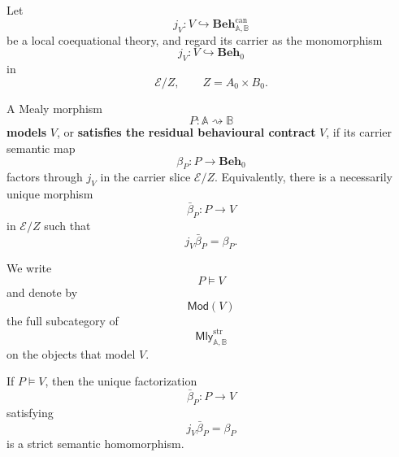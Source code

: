 \begin{definition}
\label{def:models-coequational-theory}
    Let
    \[
        j_V:
        V\hookrightarrow
        \mathbf{Beh}^{\mathrm{can}}_{\mathbb A,\mathbb B}
    \]
    be a local coequational theory, and regard its carrier as the monomorphism
    \[
        j_V:V\hookrightarrow\mathbf{Beh}_0
    \]
    in
    \[
        \mathcal E/Z,
        \qquad
        Z=A_0\times B_0.
    \]

    A Mealy morphism
    \[
        P:\mathbb A\rightsquigarrow\mathbb B
    \]
    \textbf{models} \(V\), or \textbf{satisfies the residual behavioural
    contract} \(V\), if its carrier semantic map
    \[
        \beta_P:P\to\mathbf{Beh}_0
    \]
    factors through \(j_V\) in the carrier slice \(\mathcal E/Z\).
    Equivalently, there is a necessarily unique morphism
    \[
        \bar\beta_P:P\to V
    \]
    in \(\mathcal E/Z\) such that
    \[
        j_V\bar\beta_P=\beta_P.
    \]

    We write
    \[
        P\models V
    \]
    and denote by
    \[
        \mathsf{Mod}(V)
    \]
    the full subcategory of
    \[
        \mathsf{Mly}^{\mathrm{str}}_{\mathbb A,\mathbb B}
    \]
    on the objects that model \(V\).
\end{definition}

\begin{lemma}
\label{lem:model-factorizations-strict}
    If \(P\models V\), then the unique factorization
    \[
        \bar\beta_P:P\to V
    \]
    satisfying
    \[
        j_V\bar\beta_P=\beta_P
    \]
    is a strict semantic homomorphism.
\end{lemma}

